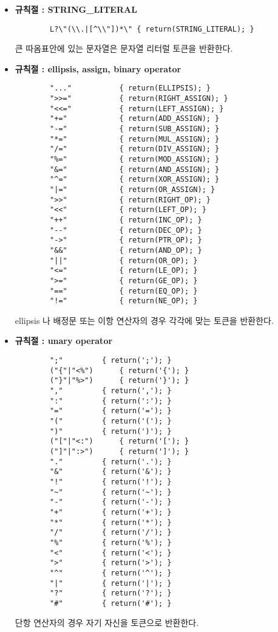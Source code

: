 \documentclass{article}
\begin{document}
\begin{itemize}
\begin{itemize}
\begin{lstlisting}
		{D}+{E}{FS}?		{ return(CONSTANT); }
		{D}*"."{D}+({E})?{FS}?	{ return(CONSTANT); }
		{D}+"."{D}*({E})?{FS}?	{ return(CONSTANT); }
		\end{lstlisting}
		숫자의 경우 10진수 뿐만 아니라 16진수, 8진수도 파악하여 CONSTANT 토큰을 반환한다.

		\item {\bf 규칙절 : STRING\_LITERAL}
		\begin{lstlisting}
		L?\"(\\.|[^\\"])*\"	{ return(STRING_LITERAL); }
		\end{lstlisting}
		큰 따옴표안에 있는 문자열은 문자열 리터럴 토큰을 반환한다.

		\item {\bf 규칙절 : ellipsis, assign, binary operator}
		\begin{lstlisting}
		"..."			{ return(ELLIPSIS); }
		">>="			{ return(RIGHT_ASSIGN); }
		"<<="			{ return(LEFT_ASSIGN); }
		"+="			{ return(ADD_ASSIGN); }
		"-="			{ return(SUB_ASSIGN); }
		"*="			{ return(MUL_ASSIGN); }
		"/="			{ return(DIV_ASSIGN); }
		"%="			{ return(MOD_ASSIGN); }
		"&="			{ return(AND_ASSIGN); }
		"^="			{ return(XOR_ASSIGN); }
		"|="			{ return(OR_ASSIGN); }
		">>"			{ return(RIGHT_OP); }
		"<<"			{ return(LEFT_OP); }
		"++"			{ return(INC_OP); }
		"--"			{ return(DEC_OP); }
		"->"			{ return(PTR_OP); }
		"&&"			{ return(AND_OP); }
		"||"			{ return(OR_OP); }
		"<="			{ return(LE_OP); }
		">="			{ return(GE_OP); }
		"=="			{ return(EQ_OP); }
		"!="			{ return(NE_OP); }
		\end{lstlisting}
		ellipsis 나 배정문 또는 이항 연산자의 경우 각각에 맞는 토큰을 반환한다.

		\item {\bf 규칙절 : unary operator}
		\begin{lstlisting}
		";"			{ return(';'); }
		("{"|"<%")		{ return('{'); }
		("}"|"%>")		{ return('}'); }
		","			{ return(','); }
		":"			{ return(':'); }
		"="			{ return('='); }
		"("			{ return('('); }
		")"			{ return(')'); }
		("["|"<:")		{ return('['); }
		("]"|":>")		{ return(']'); }
		"."			{ return('.'); }
		"&"			{ return('&'); }
		"!"			{ return('!'); }
		"~"			{ return('~'); }
		"-"			{ return('-'); }
		"+"			{ return('+'); }
		"*"			{ return('*'); }
		"/"			{ return('/'); }
		"%"			{ return('%'); }
		"<"			{ return('<'); }
		">"			{ return('>'); }
		"^"			{ return('^'); }
		"|"			{ return('|'); }
		"?"			{ return('?'); }
		"#"			{ return('#'); }
		\end{lstlisting}
		단항 연산자의 경우 자기 자신을 토큰으로 반환한다.


\end{itemize}
\end{itemize}
\end{document}
